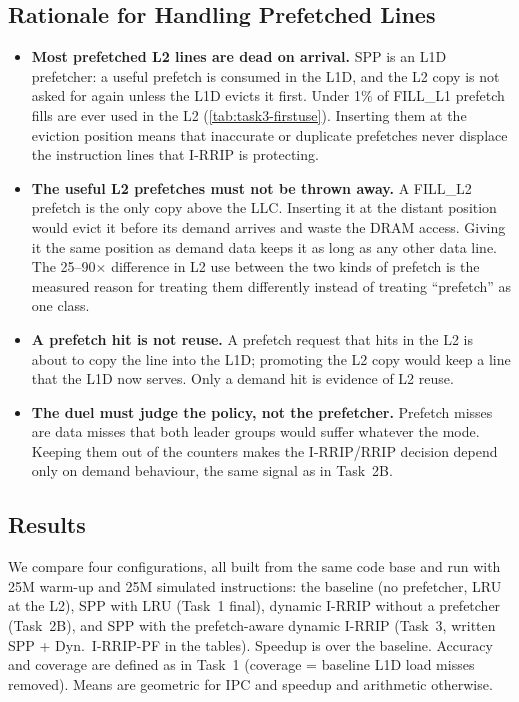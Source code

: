 \subsection{Rationale for Handling Prefetched Lines}\label{sec:task3-rationale}

\begin{itemize}
  \item \textbf{Most prefetched L2 lines are dead on arrival.} SPP is an L1D prefetcher: a useful prefetch
        is consumed in the L1D, and the L2 copy is not asked for again unless the L1D evicts it first.
        Under 1\% of FILL\_L1 prefetch fills are ever used in the L2 (\cref{tab:task3-firstuse}).
        Inserting them at the eviction position means that inaccurate or duplicate prefetches never
        displace the instruction lines that I-RRIP is protecting.
  \item \textbf{The useful L2 prefetches must not be thrown away.} A FILL\_L2 prefetch is the only copy
        above the LLC. Inserting it at the distant position would evict it before its demand arrives and
        waste the DRAM access. Giving it the same position as demand data keeps it as long as any
        other data line. The 25--90$\times$ difference in L2 use between the two kinds of prefetch is the
        measured reason for treating them differently instead of treating ``prefetch'' as one class.
  \item \textbf{A prefetch hit is not reuse.} A prefetch request that hits in the L2 is about to copy
        the line into the L1D; promoting the L2 copy would keep a line that the L1D now serves.
        Only a demand hit is evidence of L2 reuse.
  \item \textbf{The duel must judge the policy, not the prefetcher.} Prefetch misses are data misses
        that both leader groups would suffer whatever the mode. Keeping them out of the counters makes
        the I-RRIP/RRIP decision depend only on demand behaviour, the same signal as in Task~2B.
\end{itemize}

\subsection{Results}\label{sec:task3-results}

We compare four configurations, all built from the same code base and run with 25M warm-up and 25M
simulated instructions: the baseline (no prefetcher, LRU at the L2), SPP with LRU (Task~1 final),
dynamic I-RRIP without a prefetcher (Task~2B), and SPP with the prefetch-aware dynamic I-RRIP
(Task~3, written SPP + Dyn.\ I-RRIP-PF in the tables). Speedup is over the baseline. Accuracy and coverage are defined as in Task~1
(coverage = baseline L1D load misses removed). Means are geometric for IPC and speedup and
arithmetic otherwise.


